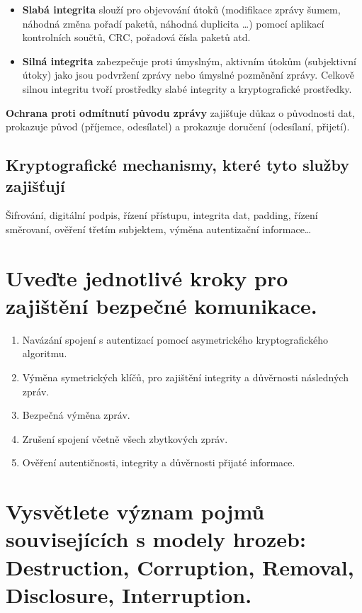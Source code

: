 \begin{itemize}
    \item \textbf{Slabá integrita} slouží pro objevování útoků (modifikace zprávy šumem, náhodná změna pořadí paketů, náhodná duplicita \dots) pomocí aplikací kontrolních součtů, CRC, pořadová čísla paketů atd.
    \item \textbf{Silná integrita} zabezpečuje proti úmyslným, aktivním útokům (subjektivní útoky) jako jsou podvržení zprávy nebo úmyslné pozměnění zprávy. Celkově silnou integritu tvoří prostředky slabé integrity a kryptografické prostředky.
\end{itemize}

\textbf{Ochrana proti odmítnutí původu zprávy} zajišťuje důkaz o původnosti dat, prokazuje původ (příjemce, odesílatel) a prokazuje doručení (odesílaní, přijetí).

\subsection{Kryptografické mechanismy, které tyto služby zajišťují}

Šifrování, digitální podpis, řízení přístupu, integrita dat, padding, řízení směrovaní, ověření třetím subjektem, výměna autentizační informace\dots

\section{Uveďte jednotlivé kroky pro zajištění bezpečné komunikace.}

\begin{enumerate}
     \item Navázání spojení s autentizací pomocí asymetrického kryptografického algoritmu.
    \item Výměna symetrických klíčů, pro zajištění integrity a důvěrnosti následných zpráv.
    \item Bezpečná výměna zpráv.
    \item Zrušení spojení včetně všech zbytkových zpráv.
    \item Ověření autentičnosti, integrity a důvěrnosti přijaté informace.
\end{enumerate}

\section{Vysvětlete význam pojmů souvisejících s modely hrozeb: Destruction, Corruption, Removal, Disclosure, Interruption.}

